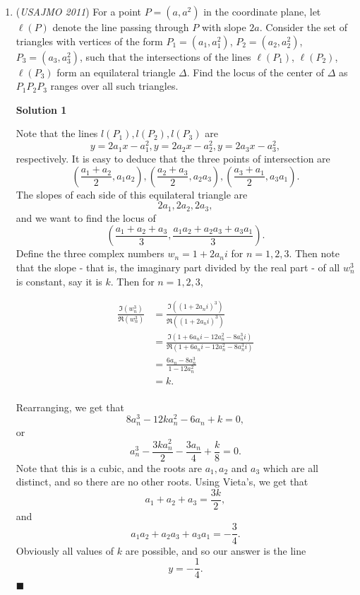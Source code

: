 \begin{enumerate}
 Therefore, the inequality is proven. $\square$



	\item (\textit{USAJMO 2011}) For a point $P = (a,a^2)$ in the coordinate plane, let $\ell(P)$ denote the line passing through $P$ with slope $2a$.  Consider the set of triangles with vertices of the form $P_1 = (a_1, a_1^2)$, $P_2 = (a_2, a_2^2)$, $P_3 = (a_3, a_3^2)$, such that the intersections of the lines $\ell(P_1)$, $\ell(P_2)$, $\ell(P_3)$ form an equilateral triangle $\Delta$.  Find the locus of the center of $\Delta$ as $P_1 P_2 P_3$ ranges over all such triangles.


 



\textbf{Solution 1}

Note that the lines $l(P_1), l(P_2), l(P_3)$ are 
 \[y=2a_1x-a_1^2, y=2a_2x-a_2^2, y=2a_3x-a_3^2,\] respectively. It is easy to deduce that the three points of intersection are 
 \[\left(\frac{a_1+a_2}{2},a_1a_2\right),\left(\frac{a_2+a_3}{2},a_2a_3\right), \left(\frac{a_3+a_1}{2},a_3a_1\right).\] The slopes of each side of this equilateral triangle are 
 \[2a_1,2a_2,2a_3,\] and we want to find the locus of 
 \[\left(\frac{a_1+a_2+a_3}{3},\frac{a_1a_2+a_2a_3+a_3a_1}{3}\right).\] Define the three complex numbers $w_n = 1+2a_ni$ for $n=1,2,3$. Then note that the slope - that is, the imaginary part divided by the real part - of all $w_n^3$ is constant, say it is $k$. Then for $n=1,2,3$,

 
 \begin{align*} \frac{\Im(w_n^3)}{\Re(w_n^3)} &= \frac{\Im((1+2a_ni)^3)}{\Re((1+2a_ni)^3)}\\ &= \frac{\Im(1+6a_ni-12a_n^2-8a_n^3i)}{\Re(1+6a_ni-12a_n^2-8a_n^3i)}\\ &= \frac{6a_n-8a_n^3}{1-12a_n^2}\\ &= k.\\ \end{align*}


 Rearranging, we get that
 \[8a_n^3 -12ka_n^2-6a_n+k=0,\]or
 \[a_n^3-\frac{3ka_n^2}2-\frac{3a_n}4+\frac k8=0.\]Note that this is a cubic, and the roots are $a_1,a_2$ and $a_3$ which are all distinct, and so there are no other roots. Using Vieta's, we get that
 \[a_1+a_2+a_3=\frac{3k}2,\]and
 \[a_1a_2+a_2a_3+a_3a_1=-\frac34.\]Obviously all values of $k$ are possible, and so our answer is the line 
 \[\boxed{y=-\frac{1}{4}.}\] $\blacksquare$





\end{enumerate}
